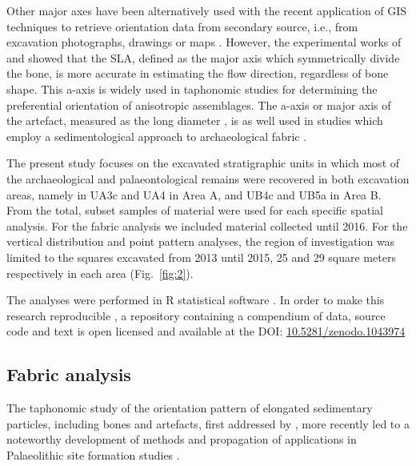 \documentclass[preprint,authoryear,times]{elsarticle} %
\begin{document}
Other major axes have been alternatively used with the recent application of GIS techniques to retrieve orientation data from secondary source, i.e., from excavation photographs, drawings or maps \citep{Boschian2010,Benito-Calvo2011,Torre2013a,Walter2013,Garcia-Moreno2016,Sanchez-Romero2016}. However, the experimental works of \cite{Dominguez-Rodrigo2013} and \cite{Dominguez-Rodrigo2014} showed that the SLA, defined as the major axis which symmetrically divide the bone, is more accurate in estimating the flow direction, regardless of bone shape. This a-axis is widely used in taphonomic studies \citep[][among others]{Toots1965,Voorhies1969,Eberth2007,Dominguez-Rodrigo2012,Dominguez-Rodrigo2014c,Aramendi2017} for determining the preferential orientation of anisotropic assemblages. The a-axis or major axis of the artefact, measured as the long diameter \citep{Krumbein1941}, is as well used in studies which employ a sedimentological approach to archaeological fabric \citep[][among others]{Bertran1995,Bertran1997,Lenoble2004,Benito-Calvo2009}.

The present study focuses on the excavated stratigraphic units in which most of the archaeological and palaeontological remains were recovered in both excavation areas, namely in UA3c and UA4 in Area A, and UB4c and UB5a in Area B. From the total, subset samples of material were used for each specific spatial analysis. For the fabric analysis we included material collected until 2016. For the vertical distribution and point pattern analyses, the region of investigation was limited to the squares excavated from 2013 until 2015, 25 and 29 square meters respectively in each area (Fig.~\ref{fig:2}).

The analyses were performed in \textsf{R} statistical software \citep{RCoreTeam2017}. In order to make this research reproducible \citep{Marwick2017,Marwick2017a}, a repository containing a compendium of data, source code and text is open licensed and available at the DOI: \href{https://doi.org/10.5281/zenodo.1043974}{10.5281/zenodo.1043974}

\subsection{Fabric analysis}

The taphonomic study of the orientation pattern of elongated sedimentary particles, including bones and artefacts, first addressed by \cite{Voorhies1969,Isaac1967,Bar-Yosef1972,Schick1986}, more recently led to a noteworthy development of methods and propagation of applications in Palaeolithic site formation studies \citep[][among others]{Bertran1995,Bertran1997,Lenoble2004,Lenoble2008,McPherron2005,Benito-Calvo2009,Benito-Calvo2011a,Benito-Calvo2011,Bernatchez2010,Boschian2010,Dominguez-Rodrigo2012,Dominguez-Rodrigo2013,Dominguez-Rodrigo2014,Torre2013a,Walter2013,Garcia-Moreno2016,Sanchez-Romero2016}.
\end{document}
